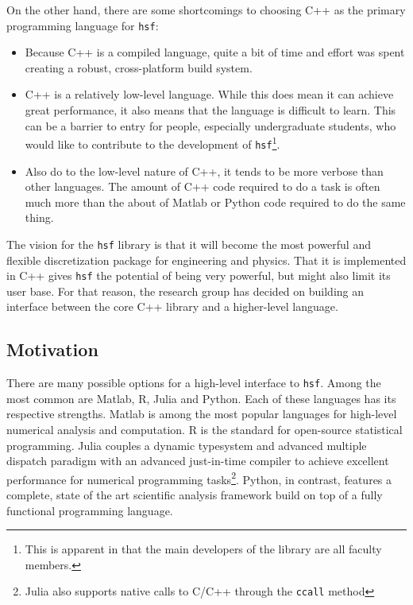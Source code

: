     On the other hand, there are some shortcomings to choosing C++ as the primary programming language for \texttt{hsf}:

    \begin{itemize}
      \item Because C++ is a compiled language, quite a bit of time and effort was spent creating a robust, cross-platform build system.
      \item  C++ is a relatively low-level language. While this does mean it can achieve great performance, it also means that the language is difficult to learn. This can be a barrier to entry for people, especially undergraduate students, who would like to contribute to the development of \texttt{hsf}\footnote{This is apparent in that the main developers of the library are all faculty members.}.
      \item Also do to the low-level nature of C++, it tends to be more verbose than other languages. The amount of C++ code required to do a task is often much more than the about of Matlab or Python code required to do the same thing.
    \end{itemize}
    \mainstretch{}

    The vision for the \texttt{hsf} library is that it will become the most powerful and flexible discretization package for engineering and physics. That it is implemented in C++ gives \texttt{hsf} the potential of being very powerful, but might also limit its user base. For that reason, the research group has decided on building an interface between the core C++ library and a higher-level language.

  \subsection{Motivation} \label{ssec:motivation}

    There are many possible options for a high-level interface to \texttt{hsf}. Among the most common are Matlab, R, Julia and Python. Each of these languages has its respective strengths. Matlab is among the most popular languages for high-level numerical analysis and computation. R is the standard for open-source statistical programming. Julia couples a dynamic typesystem and advanced multiple dispatch paradigm with an advanced just-in-time compiler to achieve excellent performance for numerical programming tasks\footnote{Julia also supports native calls to C/C++ through the \texttt{ccall} method}. Python, in contrast, features a complete, state of the art scientific analysis framework build on top of a fully functional programming language.

